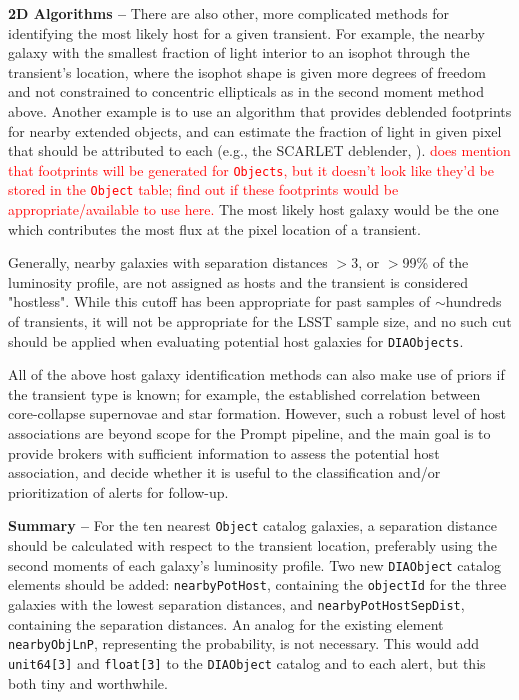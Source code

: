 \documentclass[DM,lsstdraft,authoryear,toc]{lsstdoc}
\begin{document}
{\bf 2D Algorithms --} There are also other, more complicated methods for identifying the most likely host for a given transient.
For example, the nearby galaxy with the smallest fraction of light interior to an isophot through the transient's location, where the isophot shape is given more degrees of freedom and not constrained to concentric ellipticals as in the second moment method above.
Another example is to use an algorithm that provides deblended footprints for nearby extended objects, and can estimate the fraction of light in given pixel that should be attributed to each (e.g., the SCARLET deblender, \cite{2018A&C....24..129M}).
\textcolor{red}{ does mention that footprints will be generated for {\tt Objects}, but it doesn't look like they'd be stored in the {\tt Object} table; find out if these footprints would be appropriate/available to use here.}
The most likely host galaxy would be the one which contributes the most flux at the pixel location of a transient.

Generally, nearby galaxies with separation distances $>$3, or $>$99\% of the luminosity profile, are not assigned as hosts and the transient is considered "hostless".
While this cutoff has been appropriate for past samples of $\sim$hundreds of transients, it will not be appropriate for the LSST sample size, and no such cut should be applied when evaluating potential host galaxies for {\tt DIAObjects}. 

All of the above host galaxy identification methods can also make use of priors if the transient type is known; for example, the established correlation between core-collapse supernovae and star formation.
However, such a robust level of host associations are beyond scope for the Prompt pipeline, and the main goal is to provide brokers with sufficient information to assess the potential host association, and decide whether it is useful to the classification and/or prioritization of alerts for follow-up. 

{\bf Summary --} For the ten nearest {\tt Object} catalog galaxies, a separation distance should be calculated with respect to the transient location, preferably using the second moments of each galaxy's luminosity profile. Two new {\tt DIAObject} catalog elements should be added: {\tt nearbyPotHost}, containing the {\tt objectId} for the three galaxies with the lowest separation distances, and {\tt nearbyPotHostSepDist}, containing the separation distances. An analog for the existing element {\tt nearbyObjLnP}, representing the probability, is not necessary. This would add {\tt unit64[3]} and {\tt float[3]} to the {\tt DIAObject} catalog and to each alert, but this both tiny and worthwhile.
\end{document}

